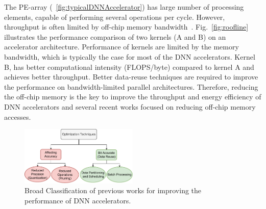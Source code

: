 \documentclass[a4paper,10pt]{article}
\begin{document}
The PE-array (\figurename{~\ref{fig:typicalDNNAccelerator}}) has large number of processing elements, capable of performing several operations per cycle. However, throughput is often limited by off-chip memory bandwidth~\cite{williams2009roofline}. Fig.~\ref{fig:roofline} illustrates the performance comparison of two kernels (A and B) on an accelerator architecture. Performance of kernels are limited by the memory bandwidth, which is typically the case for most of the DNN accelerators. Kernel B, has better computational intensity (FLOPS/byte) compared to kernel A and achieves better throughput. Better data-reuse techniques are required to improve the performance on bandwidth-limited parallel architectures. Therefore, reducing the off-chip memory is the key to improve the throughput and energy efficiency of DNN accelerators and several recent works focused on reducing off-chip memory accesses.
\begin{figure}[!htb]
	\centering
	\includegraphics[width=0.5\textwidth]{previousWorkClassification}
	\caption{Broad Classification of previous works for improving the performance of DNN accelerators.}
	\label{fig:previousWorkClassification}
\end{figure}
\end{document}
